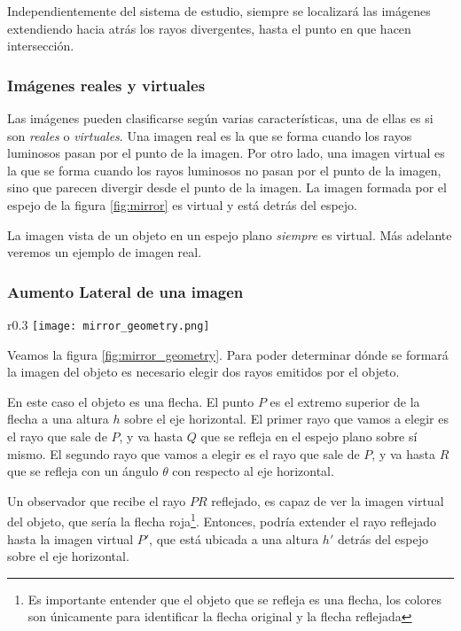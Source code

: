 \begin{tcolorbox}[myconclusion]
    Independientemente del sistema de estudio, siempre se localizará las imágenes extendiendo hacia atrás los rayos divergentes, hasta el punto en que hacen intersección.
\end{tcolorbox}


\subsubsection{Imágenes reales y virtuales}

Las imágenes pueden clasificarse según varias características, una de ellas es si son \textit{reales} o \textit{virtuales}. Una imagen real es la que se forma cuando los rayos luminosos pasan por el punto de la imagen. Por otro lado, una imagen virtual es la que se forma cuando los rayos luminosos no pasan por el punto de la imagen, sino que parecen divergir desde el punto de la imagen. La imagen formada por el espejo de la figura \ref{fig:mirror} es virtual y está detrás del espejo.

La imagen vista de un objeto en un espejo plano \textit{siempre} es virtual. Más adelante veremos un ejemplo de imagen real.

\subsubsection{Aumento Lateral de una imagen}

\begin{wrapfigure}{r}{0.3\textwidth}
  \centering
  \texttt{[image: mirror\_geometry.png]}
  \caption{Construcción geométrica utilizada para localizar la \textbf{imagen} de un objeto en un espejo plano.}
  \label{fig:mirror_geometry}
\end{wrapfigure}
Veamos la figura \ref{fig:mirror_geometry}. Para poder determinar dónde se formará la imagen del objeto es necesario elegir dos rayos emitidos por el objeto. 

En este caso el objeto es una flecha. El punto \(P\) es el extremo superior de la flecha a una altura \(h\) sobre el eje horizontal. El primer rayo que vamos a elegir es el rayo que sale de \(P\), y va hasta \(Q\) que se refleja en el espejo plano sobre sí mismo. El segundo rayo que vamos a elegir es el rayo que sale de \(P\), y va hasta \(R\) que se refleja con un ángulo \(\theta\) con respecto al eje horizontal. 

Un observador que recibe el rayo \(PR\) reflejado, es capaz de ver la imagen virtual del objeto, que sería la flecha roja\footnote{Es importante entender que el objeto que se refleja es una flecha, los colores son únicamente para identificar la flecha original y la flecha reflejada}. Entonces, podría extender el rayo reflejado hasta la imagen virtual \(P'\), que está ubicada a una altura \(h'\) detrás del espejo sobre el eje horizontal.

